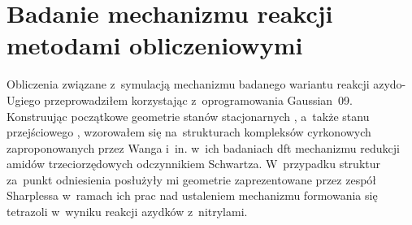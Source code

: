 \section{Badanie mechanizmu reakcji metodami obliczeniowymi}\label{experimental:mech}

Obliczenia związane z~symulacją mechanizmu badanego wariantu reakcji azydo-Ugiego przeprowadziłem
  korzystając z~oprogramowania Gaussian~09.
Konstruując początkowe geometrie stanów stacjonarnych ,
  a~także stanu przejściowego , wzorowałem się na~strukturach kompleksów
  cyrkonowych zaproponowanych przez Wanga i~in. w~ich badaniach \gls{dft} mechanizmu
  redukcji amidów trzeciorzędowych odczynnikiem Schwartza.
W~przypadku struktur  za~punkt odniesienia posłużyły
  mi geometrie zaprezentowane przez zespół Sharplessa w~ramach ich prac nad ustaleniem mechanizmu
  formowania się tetrazoli w~wyniku reakcji azydków z~nitrylami.


